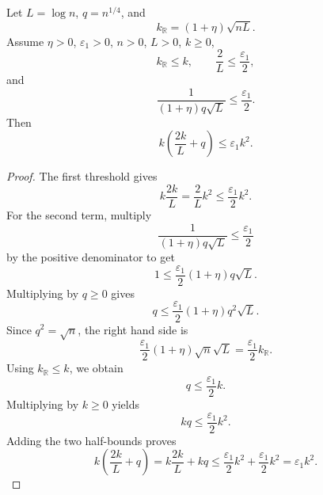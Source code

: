 \begin{helper}
Let \(L=\log n\), \(q=n^{1/4}\), and
\[
k_{\mathbb R}=(1+\eta)\sqrt{nL}.
\]
Assume \(\eta>0\), \(\varepsilon_1>0\), \(n>0\), \(L>0\), \(k\ge0\),
\[
k_{\mathbb R}\le k,\qquad
\frac{2}{L}\le\frac{\varepsilon_1}{2},
\]
and
\[
\frac{1}{(1+\eta)q\sqrt L}\le\frac{\varepsilon_1}{2}.
\]
Then
\[
k\left(\frac{2k}{L}+q\right)\le \varepsilon_1 k^2.
\]
\end{helper}
\begin{proof}
The first threshold gives
\[
k\frac{2k}{L}=\frac{2}{L}k^2
  \le\frac{\varepsilon_1}{2}k^2.
\]
For the second term, multiply
\[
\frac{1}{(1+\eta)q\sqrt L}\le\frac{\varepsilon_1}{2}
\]
by the positive denominator to get
\[
1\le\frac{\varepsilon_1}{2}(1+\eta)q\sqrt L.
\]
Multiplying by \(q\ge0\) gives
\[
q\le \frac{\varepsilon_1}{2}(1+\eta)q^2\sqrt L.
\]
Since \(q^2=\sqrt n\), the right hand side is
\[
\frac{\varepsilon_1}{2}(1+\eta)\sqrt n\sqrt L
  =\frac{\varepsilon_1}{2}k_{\mathbb R}.
\]
Using \(k_{\mathbb R}\le k\), we obtain
\[
q\le\frac{\varepsilon_1}{2}k.
\]
Multiplying by \(k\ge0\) yields
\[
kq\le\frac{\varepsilon_1}{2}k^2.
\]
Adding the two half-bounds proves
\[
k\left(\frac{2k}{L}+q\right)
=k\frac{2k}{L}+kq
\le\frac{\varepsilon_1}{2}k^2+\frac{\varepsilon_1}{2}k^2
=\varepsilon_1 k^2.
\]
\end{proof}
